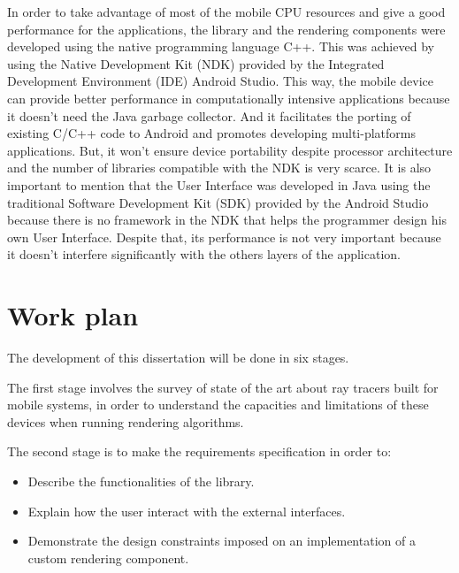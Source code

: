 \par
In order to take advantage of most of the mobile CPU resources and give a good performance for the applications, the library and the rendering components were developed using the native programming language C++.
This was achieved by using the Native Development Kit (NDK) provided by the Integrated Development Environment (IDE) Android Studio.
This way, the mobile device can provide better performance in computationally intensive applications because it doesn't need the Java garbage collector.
And it facilitates the porting of existing C/C++ code to Android and promotes developing multi-platforms applications.
But, it won't ensure device portability despite processor architecture and the number of libraries compatible with the NDK is very scarce.
It is also important to mention that the User Interface was developed in Java using the traditional Software Development Kit (SDK) provided by the Android Studio because there is no framework in the NDK that helps the programmer design his own User Interface.
Despite that, its performance is not very important because it doesn't interfere significantly with the others layers of the application.



\iffalse

\section{Work plan}

\par
The development of this dissertation will be done in six stages.

\par
The first stage involves the survey of state of the art about ray tracers built for mobile systems, in order to understand the capacities and limitations of these devices when running rendering algorithms.

\par
The second stage is to make the requirements specification in order to:

\begin{itemize}
\item Describe the functionalities of the library.
\item Explain how the user interact with the external interfaces.
\item Demonstrate the design constraints imposed on an implementation of a custom rendering component.
\end{itemize}

